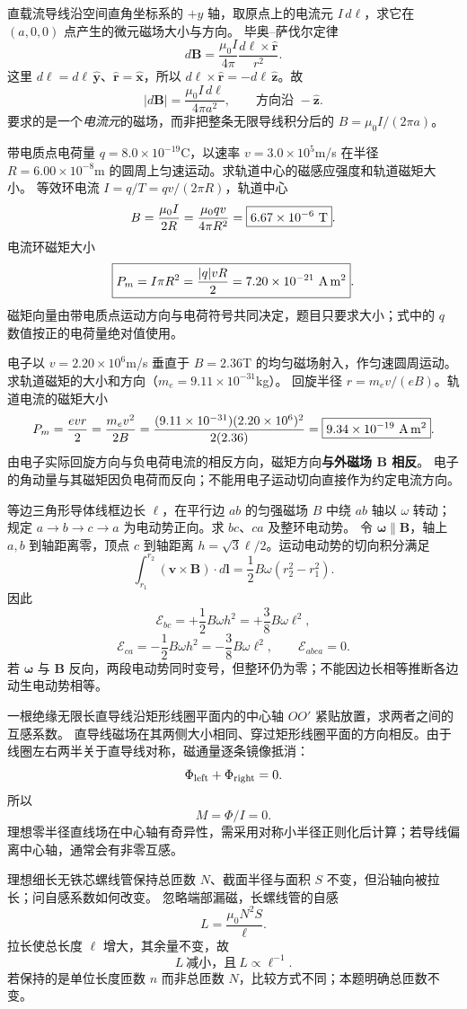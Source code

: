\problemtext 直载流导线沿空间直角坐标系的 $+y$ 轴，取原点上的电流元 $I\,d\ell$，求它在 $(a,0,0)$ 点产生的微元磁场大小与方向。
\workings 毕奥--萨伐尔定律
\[d\bm B=\frac{\mu_0I}{4\pi}
\frac{d\bm\ell\times\hat{\bm r}}{r^2}.\]
这里 $d\bm\ell=d\ell\,\hat{\bm y}$、$\hat{\bm r}=\hat{\bm x}$，所以 $d\bm\ell\times\hat{\bm r}=-d\ell\,\hat{\bm z}$。故
\[
\boxed{|d\bm B|=\frac{\mu_0 I\,d\ell}{4\pi a^2}},\qquad
\boxed{\text{方向沿 }-\hat{\bm z}}.
\]
\crosscheck 要求的是一个\emph{电流元}的磁场，而非把整条无限导线积分后的 $B=\mu_0I/(2\pi a)$。

\problemtext 带电质点电荷量 $q=8.0\times10^{-19}$C，以速率 $v=3.0\times10^5$m/s 在半径 $R=6.00\times10^{-8}$m 的圆周上匀速运动。求轨道中心的磁感应强度和轨道磁矩大小。
\workings 等效环电流 $I=q/T=qv/(2\pi R)$，轨道中心
\[
B=\frac{\mu_0I}{2R}=\frac{\mu_0qv}{4\pi R^2}
=\boxed{6.67\times10^{-6}\ {\rm T}}.
\]
电流环磁矩大小
\[
\boxed{P_m=I\pi R^2=\frac{|q|vR}{2}
=7.20\times10^{-21}\ {\rm A\,m^2}}.
\]
\crosscheck 磁矩向量由带电质点运动方向与电荷符号共同决定，题目只要求大小；式中的 $q$ 数值按正的电荷量绝对值使用。

\problemtext 电子以 $v=2.20\times10^6$m/s 垂直于 $B=2.36$T 的均匀磁场射入，作匀速圆周运动。求轨道磁矩的大小和方向（$m_e=9.11\times10^{-31}$kg）。
\workings 回旋半径 $r=m_ev/(eB)$。轨道电流的磁矩大小
\[
P_m=\frac{evr}{2}=\frac{m_ev^2}{2B}
=\frac{(9.11\times10^{-31})(2.20\times10^6)^2}{2(2.36)}
=\boxed{9.34\times10^{-19}\ {\rm A\,m^2}}.
\]
由电子实际回旋方向与负电荷电流的相反方向，磁矩方向\textbf{与外磁场 $\bm B$ 相反}。
\crosscheck 电子的角动量与其磁矩因负电荷而反向；不能用电子运动切向直接作为约定电流方向。

\problemtext 等边三角形导体线框边长 $\ell$，在平行边 $ab$ 的匀强磁场 $B$ 中绕 $ab$ 轴以 $\omega$ 转动；规定 $a\to b\to c\to a$ 为电动势正向。求 $bc$、$ca$ 及整环电动势。
\workings 令 $\bm\omega\parallel\bm B$，轴上 $a,b$ 到轴距离零，顶点 $c$ 到轴距离 $h=\sqrt3\ell/2$。运动电动势的切向积分满足
\[\int_{r_1}^{r_2}(\bm v\times\bm B)\cdot d\bm l
=\frac12B\omega(r_2^2-r_1^2).\]
因此
\[
\boxed{\mathcal E_{bc}=+\frac12B\omega h^2
=+\frac38B\omega\ell^2},
\]
\[
\boxed{\mathcal E_{ca}=-\frac12B\omega h^2
=-\frac38B\omega\ell^2},
\qquad\boxed{\mathcal E_{abca}=0}.
\]
\crosscheck 若 $\bm\omega$ 与 $\bm B$ 反向，两段电动势同时变号，但整环仍为零；不能因边长相等推断各边动生电动势相等。

\problemtext 一根绝缘无限长直导线沿矩形线圈平面内的中心轴 $OO'$ 紧贴放置，求两者之间的互感系数。
\workings 直导线磁场在其两侧大小相同、穿过矩形线圈平面的方向相反。由于线圈左右两半关于直导线对称，磁通量逐条镜像抵消：
\[\Phi_{\rm left}+\Phi_{\rm right}=0.\]
所以
\[\boxed{M=\Phi/I=0}.\]
\crosscheck 理想零半径直线场在中心轴有奇异性，需采用对称小半径正则化后计算；若导线偏离中心轴，通常会有非零互感。

\problemtext 理想细长无铁芯螺线管保持总匝数 $N$、截面半径与面积 $S$ 不变，但沿轴向被拉长；问自感系数如何改变。
\workings 忽略端部漏磁，长螺线管的自感
\[L=\frac{\mu_0N^2S}{\ell}.\]
拉长使总长度 $\ell$ 增大，其余量不变，故
\[\boxed{L\ \text{减小，且}\ L\propto\ell^{-1}}.\]
\crosscheck 若保持的是单位长度匝数 $n$ 而非总匝数 $N$，比较方式不同；本题明确总匝数不变。
